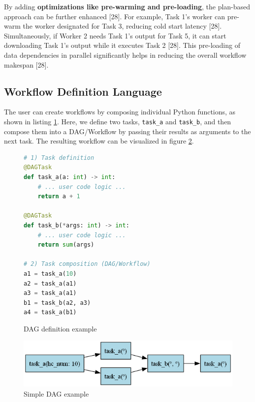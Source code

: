 \documentclass[conference]{IEEEtran}
\begin{document}
By adding \textbf{optimizations like pre-warming and pre-loading}, the plan-based approach can be further enhanced [28]. For example, Task 1's worker can pre-warm the worker designated for Task 3, reducing cold start latency [28]. Simultaneously, if Worker 2 needs Task 1's output for Task 5, it can start downloading Task 1's output while it executes Task 2 [28]. This pre-loading of data dependencies in parallel significantly helps in reducing the overall workflow makespan [28].

\subsection{Workflow Definition Language}

The user can create workflows by composing individual Python functions, as shown in listing \ref{lst:dag_lang_example}. Here, we define two tasks, \texttt{task\_a} and \texttt{task\_b}, and then compose them into a DAG/Workflow by passing their results as arguments to the next task. The resulting workflow can be visualized in figure \ref{fig:dag_example}.

\begin{figure}[h]
\centering
\begin{lstlisting}[language=Python, basicstyle=\ttfamily\footnotesize, columns=fullflexible, breaklines=true]
# 1) Task definition
@DAGTask
def task_a(a: int) -> int:
    # ... user code logic ...
    return a + 1

@DAGTask
def task_b(*args: int) -> int:
    # ... user code logic ...
    return sum(args)

# 2) Task composition (DAG/Workflow)
a1 = task_a(10)
a2 = task_a(a1)
a3 = task_a(a1)
b1 = task_b(a2, a3)
a4 = task_a(b1)
\end{lstlisting}
\caption{DAG definition example}
\label{lst:dag_lang_example}
\end{figure}

\begin{figure}[h]
    \centering
    \includegraphics[width=\columnwidth]{figures/dag_lang_example.png}
    \caption{Simple DAG example}
    \label{fig:dag_example}
\end{figure}
\end{document}
